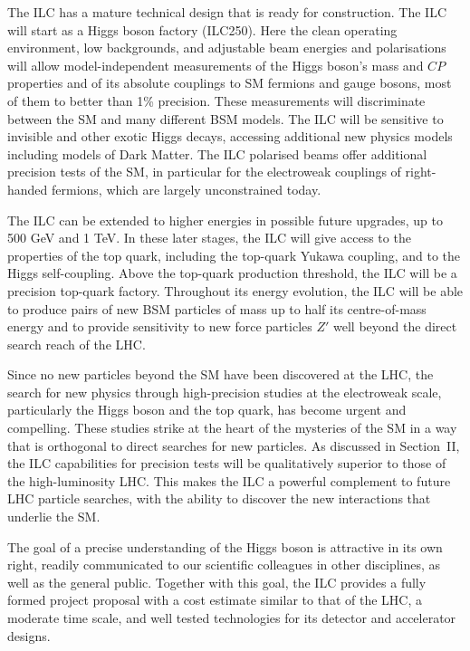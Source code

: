 \documentclass[%
 reprint,
 floatfix,
 amsmath,amssymb,
 aps,
]{revtex4-1}
\newcommand{\todo}[1]{\textcolor{red}{{#1}}}
\begin{document}

The ILC has a mature technical design
that is
 ready for construction. The ILC will start as a Higgs boson factory
 (ILC250).  Here the clean operating environment, low backgrounds, and
adjustable beam energies and polarisations will allow
model-independent 
measurements of the Higgs boson's mass and  $CP$ properties and of its
absolute couplings to SM fermions and gauge bosons, 
most of them to better than 1\% precision.  These measurements will
discriminate between the SM and many different BSM models.
The ILC will be sensitive to invisible and other exotic Higgs decays,
accessing additional new physics models including models of Dark
Matter.   The ILC polarised beams offer additional precision tests of
the SM, in particular for the electroweak couplings of right-handed
fermions, 
which are largely unconstrained today.


The ILC can be extended to higher energies in possible future
upgrades, up to 500 GeV and 1 TeV.  In these later stages, 
the ILC will give access to the properties of the top quark,
 including the top-quark Yukawa coupling, and  to the Higgs self-coupling.
Above  the top-quark production threshold,  the ILC will be
 a precision top-quark factory. Throughout its energy evolution,  the
 ILC will be able to produce pairs of new BSM particles of mass 
up to half its centre-of-mass energy and to  provide
 sensitivity to new force particles $Z'$ well beyond the direct search reach of the LHC.

Since no new particles beyond the SM have been 
discovered at the LHC, the search for new physics through
high-precision studies at the electroweak scale, particularly the Higgs boson and  the top quark, has
become
 urgent and compelling.  These studies strike at the heart of the
 mysteries of the SM in a way that is orthogonal to 
 direct searches for new particles.
 As discussed in Section~II, the ILC capabilities 
for precision tests
will be qualitatively superior  to those of the high-luminosity LHC. 
 This makes the ILC a powerful complement to  future LHC
 particle searches, with the ability to discover the new interactions that underlie the
 SM. 
 
The goal of a precise understanding of the Higgs boson is attractive
in its own right, readily communicated to our scientific
colleagues in other disciplines, as well as the general public.  Together
with this goal, the ILC provides a fully formed project proposal
with a  cost estimate
 similar to that of the LHC, a moderate time scale, and well tested
 technologies for its 
detector and accelerator designs. 
\end{document}
